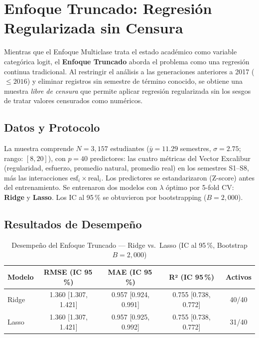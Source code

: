 \section{Enfoque Truncado: Regresión Regularizada sin Censura}
\label{sec:enfoque_truncado}

Mientras que el Enfoque Multiclase trata el estado académico como variable categórica logit,
el \textbf{Enfoque Truncado} aborda el problema como una regresión continua tradicional. 
Al restringir el análisis a las generaciones anteriores a 2017 ($\leq 2016$) y eliminar registros sin
semestre de término conocido, se obtiene una muestra \emph{libre de censura} que permite
aplicar regresión regularizada sin los sesgos de tratar valores censurados como numéricos.

\subsection{Datos y Protocolo}

La muestra comprende $N = 3{,}157$ estudiantes ($\bar{y} = 11.29$ semestres, $\sigma = 2.75$;
rango: $[8, 20]$), con $p = 40$ predictores: las cuatro métricas del Vector Excalibur
(regularidad, esfuerzo, promedio natural, promedio real) en los semestres S1–S8, más las
interacciones $\text{esf}_i \times \text{real}_i$. Los predictores se estandarizaron (Z-score)
antes del entrenamiento. Se entrenaron dos modelos con $\lambda$ óptimo por 5-fold CV:
\textbf{Ridge} y \textbf{Lasso}. Los IC al 95\,\% se obtuvieron por bootstrapping ($B = 2{,}000$).

\subsection{Resultados de Desempeño}

\begin{table}[H]
\centering
\caption{Desempeño del Enfoque Truncado — Ridge vs.\ Lasso (IC al 95\,\%, Bootstrap $B=2{,}000$)}
\label{tab:trunc_global}
\begin{tabular}{lcccc}
\toprule
\textbf{Modelo} & \textbf{RMSE (IC 95\,\%)} & \textbf{MAE (IC 95\,\%)} & \textbf{R² (IC 95\,\%)} & \textbf{Activos} \\
\midrule
Ridge  & 1.360 [1.307, 1.421] & 0.957 [0.924, 0.991] & 0.755 [0.738, 0.772] & 40/40 \\
Lasso  & 1.360 [1.307, 1.421] & 0.957 [0.925, 0.992] & 0.755 [0.738, 0.772] & 31/40 \\
\bottomrule
\end{tabular}
\end{table}

